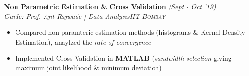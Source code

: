 \documentclass{article}
\begin{document}
\vspace{-5pt}
\textbf{Non Parametric Estimation \& Cross Validation} \hfill{\sl \small (Sept - Oct '19)}\\{\it Guide: Prof. Ajit Rajwade | Data Analysis}\hfill{\sl \small \textsc{IIT Bombay}}\\
\vspace{-19pt}
\begin{itemize}[itemsep = -1 mm, leftmargin=*]
  \item Compared non paramteric estimation methods (histograms \& Kernel Density Estimation), anaylzed the \textit{rate of convergence}
    \item Implemented Cross Validation in \textbf{MATLAB} (\textsl{bandwidth selection} giving maximum joint likelihood \& minimum deviation) %
\end{itemize}
\end{document}
